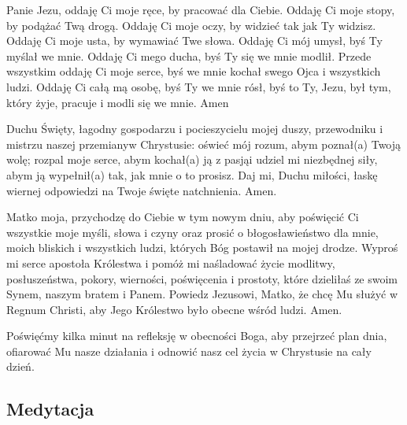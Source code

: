 ﻿\documentclass[9pt,twoside]{extarticle}
\newcommand{\gss}[1]{
  \subsection*{#1}
  \addcontentsline{toc}{subsection}{#1}
  \fancyhead[RO]{\hnb\tiny #1}
}
\begin{document}


Panie Jezu, oddaję Ci moje ręce, by pracować dla Ciebie. Oddaję Ci moje stopy, by podążać Twą drogą. Oddaję Ci moje oczy, by widzieć tak jak Ty widzisz. Oddaję Ci moje usta, by wymawiać Twe słowa. Oddaję Ci mój umysł, byś Ty myślał we mnie. Oddaję Ci mego ducha, byś Ty się we mnie modlił. Przede wszystkim oddaję Ci moje serce, byś we mnie kochał swego Ojca i wszystkich ludzi. Oddaję Ci całą mą osobę, byś Ty we mnie rósł, byś to Ty, Jezu, był tym, który żyje, pracuje i modli się we mnie. Amen


{\hnr{}}


Duchu Święty, łagodny gospodarzu i pocieszycielu mojej duszy, przewodniku i mistrzu naszej przemiany\linebreak w Chrystusie: oświeć mój rozum, abym poznał(a) Twoją wolę; rozpal moje serce, abym kochał(a) ją z pasją\linebreak i udziel mi niezbędnej siły, abym ją wypełnił(a) tak, jak mnie o to prosisz. Daj mi, Duchu miłości, łaskę wiernej odpowiedzi na Twoje święte natchnienia. Amen.


{\hnr{}}


Matko moja, przychodzę do Ciebie w tym nowym dniu, aby poświęcić Ci wszystkie moje myśli, słowa i czyny oraz prosić o błogosławieństwo dla mnie, moich bliskich i wszystkich ludzi, których Bóg postawił na mojej drodze. Wyproś mi serce apostoła Królestwa i pomóż mi naśladować życie modlitwy, posłuszeństwa, pokory, wierności, poświęcenia i prostoty, które dzieliłaś ze swoim Synem, naszym bratem i Panem. Powiedz Jezusowi, Matko, że chcę Mu służyć w Regnum Christi, aby Jego Królestwo było obecne wśród ludzi. Amen.


{\hnr{}}


{\hnr Poświęćmy kilka minut na refleksję w obecności Boga, aby przejrzeć plan dnia, ofiarować Mu nasze działania i odnowić nasz cel życia w Chrystusie na  cały dzień.}


\gss{Medytacja}
\end{document}
